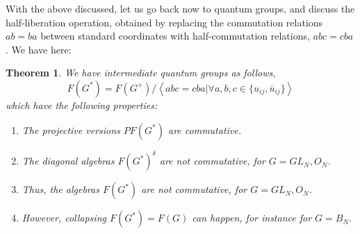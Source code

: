 \documentclass[12pt]{amsbook}
\newtheorem{theorem}{Theorem}[chapter]
\begin{document}
\bigskip

With the above discussed, let us go back now to quantum groups, and discuss the half-liberation operation, obtained by replacing the commutation relations $ab=ba$ between standard coordinates with half-commutation relations, $abc=cba$. We have here:

\begin{theorem}
We have intermediate quantum groups as follows,
$$F(G^*)=F(G^+)\Big/\left<abc=cba\Big|\forall a,b,c\in\{u_{ij},\bar{u}_{ij}\}\right>$$
which have the following properties:
\begin{enumerate}
\item The projective versions $PF(G^*)$ are commutative.

\item The diagonal algebras $F(G^*)^\delta$ are not commutative, for $G=GL_N,O_N$.

\item Thus, the algebras $F(G^*)$ are not commutative, for $G=GL_N,O_N$.

\item However, collapsing $F(G^*)=F(G)$ can happen, for instance for $G=B_N$.
\end{enumerate}
\end{theorem}
\end{document}

